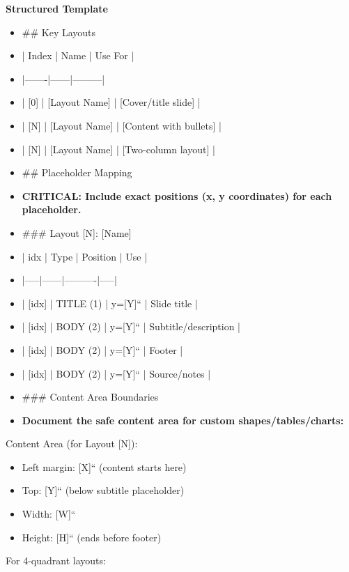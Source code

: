 \documentclass[11pt]{article}
\begin{document}
\textbf{Structured Template}
\begin{itemize}[leftmargin=*,itemsep=2pt,topsep=2pt]
\item {} \#\# Key Layouts
\item {} | Index | Name | Use For |
\item {} |-------|------|---------|
\item {} | [0] | [Layout Name] | [Cover/title slide] |
\item {} | [N] | [Layout Name] | [Content with bullets] |
\item {} | [N] | [Layout Name] | [Two-column layout] |
\item {} \#\# Placeholder Mapping
\item {} \textbf{CRITICAL: Include exact positions (x, y coordinates) for each placeholder.}
\item {} \#\#\# Layout [N]: [Name]
\item {} | idx | Type | Position | Use |
\item {} |-----|------|----------|-----|
\item {} | [idx] | TITLE (1) | y=[Y]`` | Slide title |
\item {} | [idx] | BODY (2) | y=[Y]`` | Subtitle/description |
\item {} | [idx] | BODY (2) | y=[Y]`` | Footer |
\item {} | [idx] | BODY (2) | y=[Y]`` | Source/notes |
\item {} \#\#\# Content Area Boundaries
\item {} \textbf{Document the safe content area for custom shapes/tables/charts:}
\end{itemize}
Content Area (for Layout [N]):

\begin{itemize}[leftmargin=*,itemsep=2pt,topsep=2pt]
\item {} Left margin: [X]`` (content starts here)
\item {} Top: [Y]`` (below subtitle placeholder)
\item {} Width: [W]``
\item {} Height: [H]`` (ends before footer)
\end{itemize}

For 4-quadrant layouts:
\end{document}
